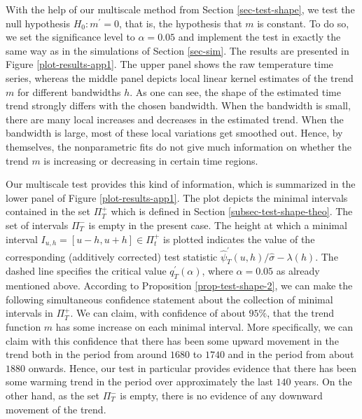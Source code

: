 \documentclass[a4paper,12pt]{article}
\begin{document}
With the help of our multiscale method from Section \ref{sec-test-shape}, we test the null hypothesis $H_0: m^\prime = 0$, that is, the hypothesis that $m$ is constant. To do so, we set the significance level to $\alpha = 0.05$ and implement the test in exactly the same way as in the simulations of Section \ref{sec-sim}. The results are presented in Figure \ref{plot-results-app1}. The upper panel shows the raw temperature time series, whereas the middle panel depicts local linear kernel estimates of the trend $m$ for different bandwidths $h$. As one can see, the shape of the estimated time trend strongly differs with the chosen bandwidth. When the bandwidth is small, there are many local increases and decreases in the estimated trend. When the bandwidth is large, most of these local variations get smoothed out. Hence, by themselves, the nonparametric fits do not give much information on whether the trend $m$ is increasing or decreasing in certain time regions. 


Our multiscale test provides this kind of information, which is summarized in the lower panel of Figure \ref{plot-results-app1}. The plot depicts the minimal intervals contained in the set $\Pi_T^+$ which is defined in Section \ref{subsec-test-shape-theo}. The set of intervals $\Pi_T^-$ is empty in the present case. The height at which a minimal interval $I_{u,h} = [u-h,u+h] \in \Pi_t^+$ is plotted indicates the value of the corresponding (additively corrected) test statistic $\widehat{\psi}^\prime_T(u,h) / \widehat{\sigma} - \lambda(h)$. The dashed line specifies the critical value $q_T^\prime(\alpha)$, where $\alpha = 0.05$ as already mentioned above. According to Proposition \ref{prop-test-shape-2}, we can make the following simultaneous confidence statement about the collection of minimal intervals in $\Pi_T^+$. We can claim, with confidence of about $95\%$, that the trend function $m$ has some increase on each minimal interval. More specifically, we can claim with this confidence that there has been some upward movement in the trend both in the period from around $1680$ to $1740$ and in the period from about $1880$ onwards. Hence, our test in particular provides evidence that there has been some warming trend in the period over approximately the last $140$ years. On the other hand, as the set $\Pi_T^-$ is empty, there is no evidence of any downward movement of the trend.  


{\small
\setlength{\bibsep}{0.55em}
}
\end{document}
